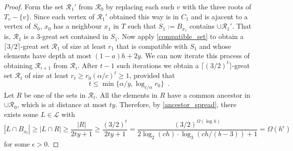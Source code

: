 \documentclass{patmorin}
\newcommand{\defin}[1]{\emph{\color{brightmaroon}#1}}
\DeclareMathOperator{\dist}{dist}
\DeclareMathOperator{\diam}{diam}
\begin{document}
\begin{proof}
  Form the set $\mathcal{R}_1'$ from $\mathcal{R}_0$ by replacing each such $v$ with the three roots of $T_v-\{v\}$.   Since each vertex of $\mathcal{R}_1'$ obtained this way is in $C_1$ and is ajacent to a vertex of $S_0$, $x_0$ has a neighbour $x_1$ in $T$ such that $S_1:=B_{x_1}$ contains $\cup\mathcal{R}_1'$.  That is, $\mathcal{R}_1$ is a $3$-great set contained in $S_1$.  Now apply \cref{compatible_set} to obtain a $\lceil 3/2\rceil$-great set $\mathcal{R}_1$ of size at least $r_1$ that is compatible with $S_1$ and whose elements have depth at most $(1-a)h+2y$.  We can now iterate this process of obtaining $\mathcal{R}_{i+1}$ from $\mathcal{R}_i$.  After $t-1$ such iterations we obtain a $\lceil(3/2)^t\rceil$-great set $\mathcal{R}_t$ of size at least $r_t \ge r_0(\alpha/c)^t \ge 1$, provided that 
  \[
    t \le \min\{\alpha/y, \log_{c/\alpha} r_0\} \enspace .
  \]
  Let $R$ be one of the sets in $\mathcal{R}_t$.  All the elements in $R$ have a common ancestor in $\cup\mathcal{R}_0$, which is at distance at most $ty$.  Therefore, by \cref{ancestor_spread}, there exists some $L\in\mathcal{L}$ with
  \[
    |L\cap B_{x_t}|\ge |L\cap R| \ge \frac{|R|}{2ty+1} 
    \ge \frac{(3/2)^t}{2ty+1}
    = \frac{(3/2)^{\Omega(\log h)}}{2\log_2(ch)\cdot\log_3(ch/(b-3))+1}
    = \Omega(h^\epsilon) 
  \] 
  for some $\epsilon >0$.
\end{proof}




\end{document}
